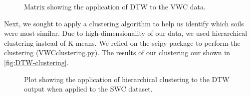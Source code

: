 \documentclass[12pt]{scrartcl}
\begin{document}
\begin{figure}[!htb]
        \caption{\label{fig:DTW-matrix} Matrix showing the application of DTW to the VWC data.}
\end{figure}

Next, we sought to apply a clustering algorithm to help us identify which soils were most similar. Due to high-dimensionality of our data, we used hierarchical clustering instead of K-means. We relied on the scipy package to perform the clustering (VWCclustering.py). The results of our clustering our shown in \autoref{fig:DTW-clustering}.

\begin{figure}[!htb]
        \caption{\label{fig:DTW-clustering} Plot showing the application of hierarchical clustering to the DTW output when applied to the SWC dataset.}
\end{figure}
\end{document}
